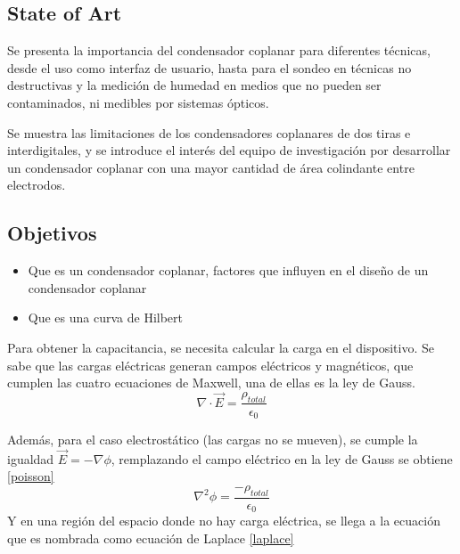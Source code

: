 \subsection{State of Art}
{\color{Mulberry} Se presenta la importancia del condensador coplanar para diferentes técnicas, desde el uso como interfaz de usuario, hasta para el sondeo en técnicas no destructivas y la medición de humedad en medios que no pueden ser contaminados, ni medibles por sistemas ópticos.

\vspace{\baselineskip}

Se muestra las limitaciones de los condensadores coplanares de dos  tiras e interdigitales, y se introduce el interés del equipo de investigación por desarrollar un condensador coplanar con una mayor cantidad de área colindante entre electrodos. }

\subsection{Objetivos}

{\begin{itemize} [label=\textcolor{Mulberry}{\textbullet}]
    \item { \color{Mulberry} Que es un condensador coplanar, factores que influyen en el diseño de un condensador coplanar}
    \item {\color{Mulberry} Que es una curva de Hilbert }
\end{itemize}}

Para obtener la capacitancia, se necesita calcular la carga en el dispositivo.
Se sabe que las cargas eléctricas generan campos eléctricos y magnéticos, que cumplen las cuatro ecuaciones de Maxwell, una de ellas es la ley de Gauss.
\\
\begin{equation}
    \nabla \cdot \Vec{E} =\frac{\rho_{total}}{\epsilon_0}
\end{equation}

Además, para el caso electrostático (las cargas no se mueven), se cumple la igualdad  $\Vec{E}=-\nabla\phi$, remplazando el campo eléctrico en la ley de Gauss se obtiene \ref{poisson} 
\\
\begin{equation}
     \label{poisson}
    \nabla^2 \phi =\frac{-\rho_{total}}{\epsilon_0}
\end{equation}
Y en una región del espacio donde no hay carga eléctrica, se llega a la ecuación  que es nombrada como ecuación de Laplace \ref{laplace}

